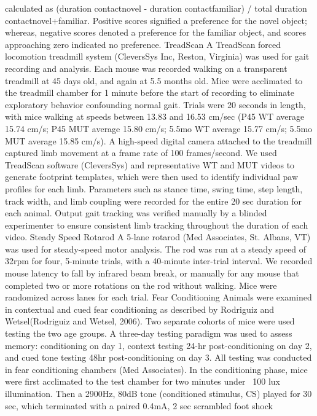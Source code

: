 calculated as (duration contactnovel - duration contactfamiliar) / total
duration contactnovel+familiar. Positive scores signified a preference for the
novel object; whereas, negative scores denoted a preference for the familiar
object, and scores approaching zero indicated no preference.
TreadScan
A TreadScan forced locomotion treadmill system (CleversSys Inc, Reston,
Virginia) was used for gait recording and analysis. Each mouse was recorded
walking on a transparent treadmill at 45 days old, and again at 5.5 months old.
Mice were acclimated to the treadmill chamber for 1 minute before the start of
recording to eliminate exploratory behavior confounding normal gait. Trials were
20 seconds in length, with mice walking at speeds between 13.83 and 16.53 cm/sec
(P45 WT average 15.74 cm/s; P45 MUT average 15.80 cm/s; 5.5mo WT average 15.77
cm/s; 5.5mo MUT average 15.85 cm/s). A high-speed digital camera attached to the
treadmill captured limb movement at a frame rate of 100 frames/second. We used
TreadScan software (CleversSys) and representative WT and MUT videos to generate
footprint templates, which were then used to identify individual paw profiles
for each limb. Parameters such as stance time, swing time, step length, track
width, and limb coupling were recorded for the entire 20 sec duration for each
animal. Output gait tracking was verified manually by a blinded experimenter to
ensure consistent limb tracking throughout the duration of each video. 
Steady Speed Rotarod
A 5-lane rotarod (Med Associates, St. Albans, VT) was used for steady-speed
motor analysis. The rod was run at a steady speed of 32rpm for four, 5-minute
trials, with a 40-minute inter-trial interval. We recorded mouse latency to fall
by infrared beam break, or manually for any mouse that completed two or more
rotations on the rod without walking. Mice were randomized across lanes for each
trial. 
Fear Conditioning
Animals were examined in contextual and cued fear conditioning as described by
Rodriguiz and Wetsel(Rodriguiz and Wetsel, 2006). Two separate cohorts of mice
were used testing the two age groups. A three-day testing paradigm was used to
assess memory: conditioning on day 1, context testing 24-hr post-conditioning on
day 2, and cued tone testing 48hr post-conditioning on day 3. All testing was
conducted in fear conditioning chambers (Med Associates). In the conditioning
phase, mice were first acclimated to the test chamber for two minutes under ~100
lux illumination. Then a 2900Hz, 80dB tone (conditioned stimulus, CS) played for
30 sec, which terminated with a paired 0.4mA, 2 sec scrambled foot shock
